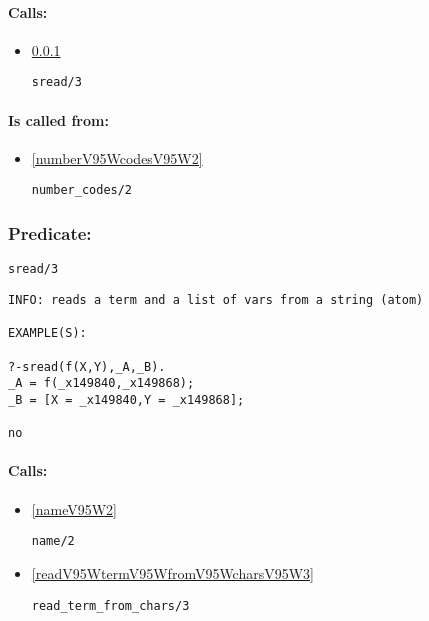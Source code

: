 \paragraph{Calls:} 
\begin{itemize}
\item \ref{sreadV95W3} 
\begin{verbatim}
sread/3
\end{verbatim}

\end{itemize}
\paragraph{Is called from:} 
\begin{itemize}
\item \ref{numberV95WcodesV95W2} 
\begin{verbatim}
number_codes/2
\end{verbatim}

\end{itemize}

\subsubsection{Predicate:} \label{sreadV95W3}

\begin{verbatim}
sread/3
\end{verbatim}

{\small \begin{verbatim}
INFO: reads a term and a list of vars from a string (atom)

EXAMPLE(S):

?-sread(f(X,Y),_A,_B).
_A = f(_x149840,_x149868);
_B = [X = _x149840,Y = _x149868];

no

\end{verbatim}}
\paragraph{Calls:} 
\begin{itemize}
\item \ref{nameV95W2} 
\begin{verbatim}
name/2
\end{verbatim}

\item \ref{readV95WtermV95WfromV95WcharsV95W3} 
\begin{verbatim}
read_term_from_chars/3
\end{verbatim}

\end{itemize}
